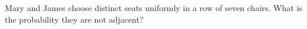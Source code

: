 Mary and James choose distinct seats uniformly in a row of seven chairs. What is the probability they are not adjacent?
